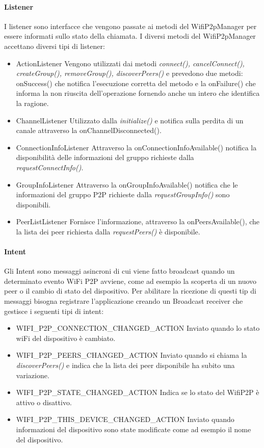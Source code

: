 \documentclass{llncs}
\begin{document}
\paragraph{Listener}
I listener sono interfacce che vengono passate ai metodi del WifiP2pManager per essere informati sullo stato della chiamata. I diversi metodi del WifiP2pManager accettano diversi tipi di listener:
\begin{itemize}
	\item{ActionListener} Vengono utilizzati dai metodi \textit{connect(), cancelConnect(), createGroup(), removeGroup(), discoverPeers()} e prevedono due metodi: onSuccess() che notifica l'esecuzione corretta del metodo e la onFailure() che informa la non riuscita dell'operazione fornendo anche un intero che identifica la ragione.
	\item{ChannelListener} Utilizzato dalla \textit{initialize()} e notifica sulla perdita di un canale attraverso la onChannelDisconnected().
	\item{ConnectionInfoListener} Attraverso la onConnectionInfoAvailable() notifica la disponibilità delle informazioni del gruppo richieste dalla \textit{requestConnectInfo()}.
	\item{GroupInfoListener} Attraverso la onGroupInfoAvailable() notifica che le informazioni del gruppo P2P richieste dalla \textit{requestGroupInfo()} sono disponibili.
	\item{PeerListListener} Fornisce l'informazione, attraverso la onPeersAvailable(), che la lista dei peer richiesta dalla \textit{requestPeers()} è disponibile.
\end{itemize}

\paragraph{Intent}
Gli Intent sono messaggi asincroni di cui viene fatto broadcast quando un determinato evento WiFi P2P avviene, come ad esempio la scoperta di un  nuovo peer o il cambio di stato del dispositivo. Per abilitare la ricezione di questi tip di messaggi bisogna registrare l'applicazione creando un Broadcast receiver che gestisce i seguenti tipi di intent:
\begin{itemize}
	\item{WIFI\_P2P\_CONNECTION\_CHANGED\_ACTION} Inviato quando lo stato wiFi del dispositivo è cambiato.
	\item{WIFI\_P2P\_PEERS\_CHANGED\_ACTION} Inviato quando si chiama la  \textit{discoverPeers()} e indica che la lista dei peer disponibile ha subito una variazione.
	\item{WIFI\_P2P\_STATE\_CHANGED\_ACTION} Indica se lo stato del WifiP2P è attivo o disattivo.
	\item{WIFI\_P2P\_THIS\_DEVICE\_CHANGED\_ACTION} Inviato quando informazioni del dispositivo sono state modificate come ad esempio il nome del dispositivo.
\end{itemize}
\end{document}
